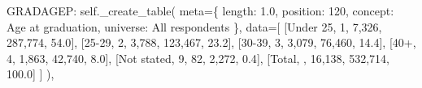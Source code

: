 \documentclass[
  11pt,
  a4paper,
]{article}
\newenvironment{Shaded}{\begin{snugshade}}{\end{snugshade}}
\newcommand{\NormalTok}[1]{\textcolor[rgb]{0.00,0.23,0.31}{#1}}
\newcommand{\OperatorTok}[1]{\textcolor[rgb]{0.37,0.37,0.37}{#1}}
\newcommand{\StringTok}[1]{\textcolor[rgb]{0.13,0.47,0.30}{#1}}
\newcommand{\VariableTok}[1]{\textcolor[rgb]{0.07,0.07,0.07}{#1}}
\begin{document}
\begin{Shaded}
\begin{Highlighting}[]
    \StringTok{\textquotesingle{}GRADAGEP\textquotesingle{}}\NormalTok{: }\VariableTok{self}\NormalTok{.\_create\_table(}
\NormalTok{        meta}\OperatorTok{=}\NormalTok{\{}
            \StringTok{\textquotesingle{}length\textquotesingle{}}\NormalTok{: }\StringTok{\textquotesingle{}1.0\textquotesingle{}}\NormalTok{, }\StringTok{\textquotesingle{}position\textquotesingle{}}\NormalTok{: }\StringTok{\textquotesingle{}120\textquotesingle{}}\NormalTok{,}
            \StringTok{\textquotesingle{}concept\textquotesingle{}}\NormalTok{: }\StringTok{\textquotesingle{}Age at graduation\textquotesingle{}}\NormalTok{,}
            \StringTok{\textquotesingle{}universe\textquotesingle{}}\NormalTok{: }\StringTok{\textquotesingle{}All respondents\textquotesingle{}}
\NormalTok{        \},}
\NormalTok{        data}\OperatorTok{=}\NormalTok{[}
\NormalTok{            [}\StringTok{\textquotesingle{}Under 25\textquotesingle{}}\NormalTok{, }\StringTok{\textquotesingle{}1\textquotesingle{}}\NormalTok{, }\StringTok{\textquotesingle{}7,326\textquotesingle{}}\NormalTok{, }\StringTok{\textquotesingle{}287,774\textquotesingle{}}\NormalTok{, }\StringTok{\textquotesingle{}54.0\textquotesingle{}}\NormalTok{],}
\NormalTok{            [}\StringTok{\textquotesingle{}25{-}29\textquotesingle{}}\NormalTok{, }\StringTok{\textquotesingle{}2\textquotesingle{}}\NormalTok{, }\StringTok{\textquotesingle{}3,788\textquotesingle{}}\NormalTok{, }\StringTok{\textquotesingle{}123,467\textquotesingle{}}\NormalTok{, }\StringTok{\textquotesingle{}23.2\textquotesingle{}}\NormalTok{],}
\NormalTok{            [}\StringTok{\textquotesingle{}30{-}39\textquotesingle{}}\NormalTok{, }\StringTok{\textquotesingle{}3\textquotesingle{}}\NormalTok{, }\StringTok{\textquotesingle{}3,079\textquotesingle{}}\NormalTok{, }\StringTok{\textquotesingle{}76,460\textquotesingle{}}\NormalTok{, }\StringTok{\textquotesingle{}14.4\textquotesingle{}}\NormalTok{],}
\NormalTok{            [}\StringTok{\textquotesingle{}40+\textquotesingle{}}\NormalTok{, }\StringTok{\textquotesingle{}4\textquotesingle{}}\NormalTok{, }\StringTok{\textquotesingle{}1,863\textquotesingle{}}\NormalTok{, }\StringTok{\textquotesingle{}42,740\textquotesingle{}}\NormalTok{, }\StringTok{\textquotesingle{}8.0\textquotesingle{}}\NormalTok{],}
\NormalTok{            [}\StringTok{\textquotesingle{}Not stated\textquotesingle{}}\NormalTok{, }\StringTok{\textquotesingle{}9\textquotesingle{}}\NormalTok{, }\StringTok{\textquotesingle{}82\textquotesingle{}}\NormalTok{, }\StringTok{\textquotesingle{}2,272\textquotesingle{}}\NormalTok{, }\StringTok{\textquotesingle{}0.4\textquotesingle{}}\NormalTok{],}
\NormalTok{            [}\StringTok{\textquotesingle{}Total\textquotesingle{}}\NormalTok{, }\StringTok{\textquotesingle{}\textquotesingle{}}\NormalTok{, }\StringTok{\textquotesingle{}16,138\textquotesingle{}}\NormalTok{, }\StringTok{\textquotesingle{}532,714\textquotesingle{}}\NormalTok{, }\StringTok{\textquotesingle{}100.0\textquotesingle{}}\NormalTok{]}
\NormalTok{        ]}
\NormalTok{    ),}
            

\end{Highlighting}
\end{Shaded}
\end{document}
